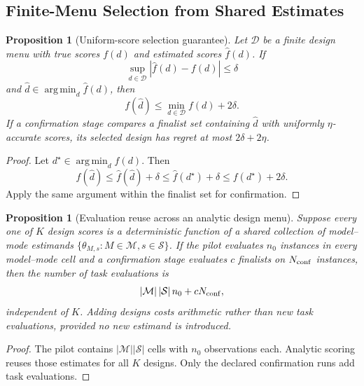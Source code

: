 \documentclass[10pt]{article}
\DeclareMathOperator*{\argmin}{arg\,min}
\theoremstyle{paperplain}
\newtheorem{proposition}[theorem]{Proposition}
\theoremstyle{paperdefinition}
\theoremstyle{paperremark}
\begin{document}
\subsection{Finite-Menu Selection from Shared Estimates}

\begin{proposition}[Uniform-score selection guarantee]
\label{prop:uniform-score-selection}
Let \(\mathcal D\) be a finite design menu with true scores \(f(d)\) and
estimated scores \(\widehat f(d)\).  If
\[
  \sup_{d\in\mathcal D}|\widehat f(d)-f(d)|\le\delta
\]
and \(\widehat d\in\argmin_d\widehat f(d)\), then
\[
  f(\widehat d)\le\min_{d\in\mathcal D}f(d)+2\delta.
\]
If a confirmation stage compares a finalist set containing \(\widehat d\)
with uniformly \(\eta\)-accurate scores, its selected design has regret at
most \(2\delta+2\eta\).
\end{proposition}

\begin{proof}
Let \(d^\star\in\argmin_d f(d)\).  Then
\[
  f(\widehat d)
  \le\widehat f(\widehat d)+\delta
  \le\widehat f(d^\star)+\delta
  \le f(d^\star)+2\delta.
\]
Apply the same argument within the finalist set for confirmation.
\end{proof}

\begin{proposition}[Evaluation reuse across an analytic design menu]
\label{prop:evaluation-reuse}
Suppose every one of \(K\) design scores is a deterministic function of a
shared collection of model--mode estimands
\(\{\theta_{M,s}:M\in\mathcal M,s\in\mathcal S\}\).
If the pilot evaluates \(n_0\) instances in every model--mode cell and a
confirmation stage evaluates \(c\) finalists on \(N_{\rm conf}\) instances,
then the number of task evaluations is
\[
  |\mathcal M|\,|\mathcal S|\,n_0+cN_{\rm conf},
\]
independent of \(K\).  Adding designs costs arithmetic rather than new task
evaluations, provided no new estimand is introduced.
\end{proposition}

\begin{proof}
The pilot contains
\(|\mathcal M||\mathcal S|\) cells with \(n_0\) observations each.
Analytic scoring reuses those estimates for all \(K\) designs.  Only the
declared confirmation runs add task evaluations.
\end{proof}
\end{document}
